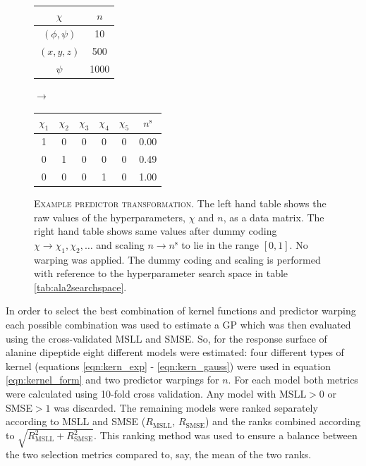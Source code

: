 \begin{figure}
    \centering
    \caption[Example predictor transformation]{\textsc{Example predictor transformation}. The left hand table shows the raw values of the hyperparameters, $\chi$ and $n$, as a data matrix. The right hand table shows same values after dummy coding $\chi \rightarrow \chi_{1}, \chi_{2}, \ldots$ and scaling $n\rightarrow n^{\mathrm{s}}$ to lie in the range $[0, 1]$. No warping was applied. The dummy coding and scaling is performed with reference to the hyperparameter search space in table \ref{tab:ala2searchspace}.}
    \begin{tabular}{cc}
        \toprule
        $\chi$    &  $n$ \\
        \midrule
        $(\phi, \psi)$    &  10 \\
        $(x, y, z)$ & 500 \\
        $\psi$  & 1000 \\
        \bottomrule
        \end{tabular}
    $\longrightarrow $
    \begin{tabular}{cccccc}
        \toprule
        $\chi_{1}$ &$\chi_{2}$ &$\chi_{3}$ &$\chi_{4}$ &$\chi_{5}$ &  $n^{\mathrm{s}}$ \\
        \midrule
        1 & 0 & 0 & 0 & 0  &  \num{0.00} \\
        0 & 1 & 0 & 0 & 0  &  \num{0.49} \\
        0 & 0 & 0 & 1 & 0  &  \num{1.00} \\
        \bottomrule
    \end{tabular} 
    \label{fig:msm_eg_transform}
\end{figure}

In order to select the best combination of kernel functions and predictor warping each possible combination was used to estimate a GP which was then evaluated using the cross-validated MSLL and SMSE. So, for the response surface of alanine dipeptide eight different models were estimated: four different types of kernel (equations \ref{eqn:kern_exp} - \ref{eqn:kern_gauss}) were used in equation \ref{eqn:kernel_form} and two predictor warpings for $n$. For each model both metrics were calculated using 10-fold cross validation. Any model with MSLL$ > 0$ or SMSE$ > 1$ was discarded. The remaining models were ranked separately according to MSLL and SMSE ($R_{\mathrm{MSLL}}$, $R_{\mathrm{SMSE}}$) and the ranks combined according to $\sqrt{R_{\mathrm{MSLL}}^2 + R_{\mathrm{SMSE}}^2}$. This ranking method was used to ensure a balance between the two selection metrics compared to, say, the mean of the two ranks.  


